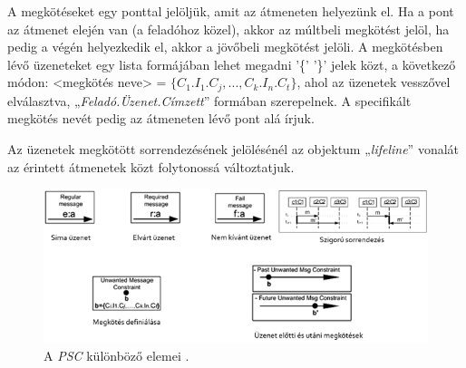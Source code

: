 A megkötéseket egy ponttal jelöljük, amit az átmeneten helyezünk el.
Ha a pont az átmenet elején van (a feladóhoz közel), akkor az múltbeli megkötést jelöl, ha pedig a végén helyezkedik el, akkor a jövőbeli megkötést jelöli.
A megkötésben lévő üzeneteket egy lista formájában lehet megadni ’\{’ ’\}’ jelek közt, a következő módon: <megkötés neve> = $\{C_{1}.I_{1}.C_{j}, ..., C_{k}.I_{n}.C_{t}\}$, ahol az üzenetek vesszővel elválasztva, „\textit{Feladó.Üzenet.Címzett}” formában szerepelnek.
A specifikált megkötés nevét pedig az átmeneten lévő pont alá írjuk.

Az üzenetek megkötött sorrendezésének jelölésénél az objektum „\textit{lifeline}” vonalát az érintett átmenetek közt folytonossá változtatjuk.

\begin{figure}[!ht]
    \centering
    \includegraphics[width=150mm, keepaspectratio]{figures/2abra.png}
    \caption{A \textit{PSC} különböző elemei \cite{PSC1}.}
    \label{psc_elemek}
\end{figure}

